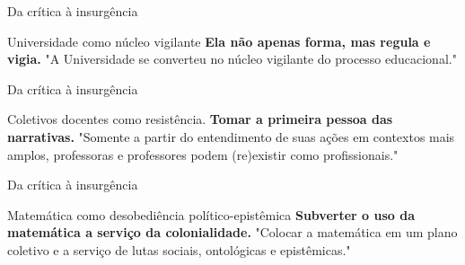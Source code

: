 \documentclass[12pt]{beamer}
\begin{document}
		\begin{frame}{Da crítica à insurgência}
			\begin{alertblock}{Universidade como núcleo vigilante}
				\justifying
				\textbf{Ela não apenas forma, mas regula e vigia.} "A Universidade se converteu no núcleo vigilante do processo educacional." 
			\end{alertblock}
			
		\end{frame}
		
		\begin{frame}{Da crítica à insurgência}
			\begin{alertblock}{Coletivos docentes como resistência.}
				\justifying
				\textbf{Tomar a primeira pessoa das narrativas.} "Somente a partir do entendimento de suas ações em contextos mais amplos, professoras e professores podem (re)existir como profissionais." 
			\end{alertblock}
			
		\end{frame}
		
		\begin{frame}{Da crítica à insurgência}
			\begin{alertblock}{Matemática como desobediência político-epistêmica}
				\justifying
				\textbf{Subverter o uso da matemática a serviço da colonialidade.} "Colocar a matemática em um plano coletivo e a serviço de lutas sociais, ontológicas e epistêmicas."
			\end{alertblock}
			
		\end{frame}
		
\end{document}
